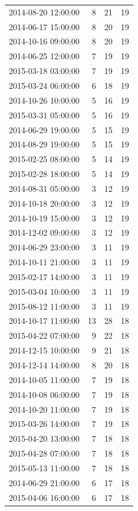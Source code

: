 \begin{tabular}{lrrr}
2014-08-20 12:00:00 & 8 & 21 & 19 \\
2014-06-17 15:00:00 & 8 & 20 & 19 \\
2014-10-16 09:00:00 & 8 & 20 & 19 \\
2014-06-25 12:00:00 & 7 & 19 & 19 \\
2015-03-18 03:00:00 & 7 & 19 & 19 \\
2015-03-24 06:00:00 & 6 & 18 & 19 \\
2014-10-26 10:00:00 & 5 & 16 & 19 \\
2015-03-31 05:00:00 & 5 & 16 & 19 \\
2014-06-29 19:00:00 & 5 & 15 & 19 \\
2014-08-29 19:00:00 & 5 & 15 & 19 \\
2015-02-25 08:00:00 & 5 & 14 & 19 \\
2015-02-28 18:00:00 & 5 & 14 & 19 \\
2014-08-31 05:00:00 & 3 & 12 & 19 \\
2014-10-18 20:00:00 & 3 & 12 & 19 \\
2014-10-19 15:00:00 & 3 & 12 & 19 \\
2014-12-02 09:00:00 & 3 & 12 & 19 \\
2014-06-29 23:00:00 & 3 & 11 & 19 \\
2014-10-11 21:00:00 & 3 & 11 & 19 \\
2015-02-17 14:00:00 & 3 & 11 & 19 \\
2015-03-04 10:00:00 & 3 & 11 & 19 \\
2015-08-12 11:00:00 & 3 & 11 & 19 \\
2014-10-17 11:00:00 & 13 & 28 & 18 \\
2015-04-22 07:00:00 & 9 & 22 & 18 \\
2014-12-15 10:00:00 & 9 & 21 & 18 \\
2014-12-14 14:00:00 & 8 & 20 & 18 \\
2014-10-05 11:00:00 & 7 & 19 & 18 \\
2014-10-08 06:00:00 & 7 & 19 & 18 \\
2014-10-20 11:00:00 & 7 & 19 & 18 \\
2015-03-26 14:00:00 & 7 & 19 & 18 \\
2015-04-20 13:00:00 & 7 & 18 & 18 \\
2015-04-28 07:00:00 & 7 & 18 & 18 \\
2015-05-13 11:00:00 & 7 & 18 & 18 \\
2014-06-29 21:00:00 & 6 & 17 & 18 \\
2015-04-06 16:00:00 & 6 & 17 & 18 \\

\end{tabular}
